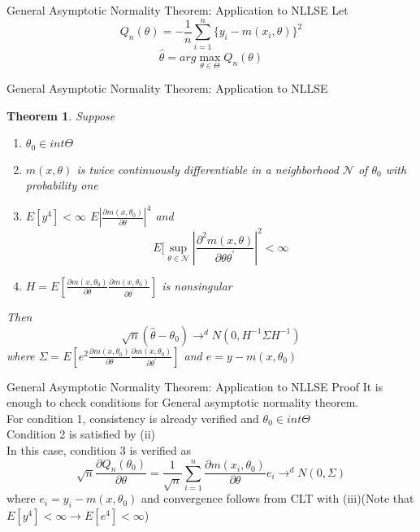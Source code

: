 \documentclass{beamer}
\newtheorem{thm}{Theorem}[subsection]
\begin{document}
\begin{frame}{General Asymptotic Normality Theorem: Application to NLLSE}
	Let 
	\[Q_n(\theta) = -\frac{1}{n} \sum^n_{i=1} \{y_i - m(x_i,\theta)\}^2\]
	\[\hat{\theta} = arg \max_{\theta \in \Theta} Q_n(\theta)\]
\end{frame}
\begin{frame}{General Asymptotic Normality Theorem: Application to NLLSE}
\begin{thm}
	Suppose
	\begin{enumerate}
			\item $\theta_0 \in int \Theta$
			\item $m(x,\theta)$ is twice continuously differentiable in a neighborhood $\mathcal{N}$ of $\theta_0$ with probability one
			\item $E[y^4] < \infty$ $E|\frac{\partial m(x,\theta_0)}{\partial \theta}|^4$ and 
				\[E[\sup_{\theta \in \mathcal{N}} | \frac{\partial^2 m(x,\theta)}{\partial \theta \theta^{'}}|^2 < \infty\]
				\item $H = E[\frac{\partial m(x,\theta_0)}{\partial \theta} \frac{\partial m(x,\theta_0)}{\partial \theta^{'}}]$ is nonsingular
	\end{enumerate}
	Then 
	\[\sqrt{n}(\hat{\theta} - \theta_0) \rightarrow^d N(0, H^{-1} \Sigma H^{-1})\]
	where $\Sigma = E[e^2 \frac{\partial m(x,\theta_0)}{\partial \theta} \frac{\partial m(x,\theta_0)}{\partial \theta^{'}}]$ and $e = y - m(x,\theta_0)$
\end{thm}
\end{frame}
\begin{frame}{General Asymptotic Normality Theorem: Application to NLLSE Proof}
	It is enough to check conditions for General asymptotic normality theorem. \\
	For condition 1, consistency is already verified and $\theta_0 \in int\Theta$\\
	Condition 2 is satisfied by (ii) \\
	In this case, condition 3 is verified as 
	\[\sqrt{n} \frac{\partial Q_n(\theta_0)}{\partial \theta} = \frac{1}{\sqrt{n}} \sum^n_{i=1} \frac{\partial m(x_i,\theta_0)}{\partial \theta} e_i \rightarrow^d N(0,\Sigma)\]
	where $e_i = y_i - m(x,\theta_0)$ and convergence follows from CLT with (iii)(Note that $E[y^4] <\infty \rightarrow E[e^4] < \infty$)
\end{frame}
\end{document}
